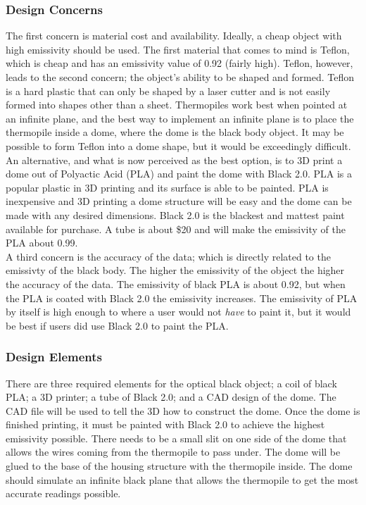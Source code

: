 \documentclass[10pt,draftclsnofoot,onecolumn,letterpaper]{article}
\begin{document}
\subsubsection{Design Concerns}
The first concern is material cost and availability. Ideally, a cheap object with high emissivity should be used. The first material that comes to mind is Teflon, which is cheap and has an emissivity value of 0.92 (fairly high). Teflon, however, leads to the second concern; the object's ability to be shaped and formed. Teflon is a hard plastic that can only be shaped by a laser cutter and is not easily formed into shapes other than a sheet. Thermopiles work best when pointed at an infinite plane, and the best way to implement an infinite plane is to place the thermopile inside a dome, where the dome is the black body object. It may be possible to form Teflon into a dome shape, but it would be exceedingly difficult. An alternative, and what is now perceived as the best option, is to 3D print a dome out of Polyactic Acid (PLA) and paint the dome with Black 2.0. PLA is a popular plastic in 3D printing and its surface is able to be painted. PLA is inexpensive and 3D printing a dome structure will be easy and the dome can be made with any desired dimensions. Black 2.0 is the blackest and mattest paint available for purchase. A tube is about \$20 and will make the emissivity of the PLA about 0.99.\\A third concern is the accuracy of the data; which is directly related to the emissivty of the black body. The higher the emissivity of the object the higher the accuracy of the data. The emissivity of black PLA is about 0.92, but when the PLA is coated with Black 2.0 the emissivity increases. The emissivity of PLA by itself is high enough to where a user would not \textit{have} to paint it, but it would be best if users did use Black 2.0 to paint the PLA.
\subsubsection{Design Elements}
There are three required elements for the optical black object; a coil of black PLA; a 3D printer; a tube of Black 2.0; and a CAD design of the dome. The CAD file will be used to tell the 3D how to construct the dome. Once the dome is finished printing, it must be painted with Black 2.0 to achieve the highest emissivity possible. There needs to be a small slit on one side of the dome that allows the wires coming from the thermopile to pass under. The dome will be glued to the base of the housing structure with the thermopile inside. The dome should simulate an infinite black plane that allows the thermopile to get the most accurate readings possible. 
\end{document}
